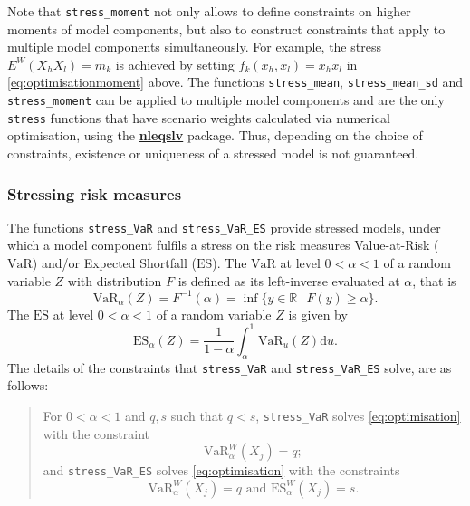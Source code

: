 \documentclass[
]{article}
\begin{document}
Note that \texttt{stress\_moment} not only allows to define constraints on higher moments of model components, but also to construct constraints that apply to multiple model components simultaneously. For example, the stress \(E^W(X_h X_l) =m_k\) is achieved by setting \(f_k(x_h, x_l) = x_h x_l\) in \eqref{eq:optimisationmoment} above. The functions \texttt{stress\_mean}, \texttt{stress\_mean\_sd} and \texttt{stress\_moment} can be applied to multiple model components and are the only \texttt{stress} functions that have scenario weights calculated via numerical optimisation, using the \href{https://CRAN.R-project.org/package=nleqslv}{\textbf{nleqslv}} package. Thus, depending on the choice of constraints, existence or uniqueness of a stressed model is not guaranteed.

\hypertarget{Sec:RiskMeasures}{%
\subsubsection{Stressing risk measures}\label{Sec:RiskMeasures}}

The functions \texttt{stress\_VaR} and \texttt{stress\_VaR\_ES} provide stressed models, under which a model component fulfils a stress on the risk measures Value-at-Risk (\(\text{VaR}\)) and/or Expected Shortfall (\(\text{ES}\)). The \(\text{VaR}\) at level \(0 < \alpha < 1\) of a random variable \(Z\) with distribution \(F\) is defined as its left-inverse evaluated at \(\alpha\), that is
\[\text{VaR}_\alpha(Z) = F^{-1}(\alpha) = \inf\{ y \in \mathbb{R} ~|~F(y) \geq \alpha\}.\]
The \(\text{ES}\) at level \(0 < \alpha < 1\) of a random variable \(Z\) is given by \[\text{ES}_\alpha(Z) =\frac{1}{1-\alpha}\int_\alpha^1 \text{VaR}_u(Z) \mathrm{d}u.\]
The details of the constraints that \texttt{stress\_VaR} and \texttt{stress\_VaR\_ES} solve, are as follows:

\begin{quote}
For \(0< \alpha <1\) and \(q, s\) such that \(q < s\), \texttt{stress\_VaR} solves \eqref{eq:optimisation} with the constraint
\begin{equation} 
\text{VaR}_{\alpha }^W(X_j) = q;  \label{eq:optimisationVaR}
\end{equation}
and \texttt{stress\_VaR\_ES} solves \eqref{eq:optimisation} with the constraints
\begin{equation}                                                
\text{VaR}_{\alpha }^W(X_j) = q \text{ and ES}_{\alpha }^W(X_j) = s.\label{eq:optimisationVaRES}
\end{equation}
\end{quote}
\end{document}
